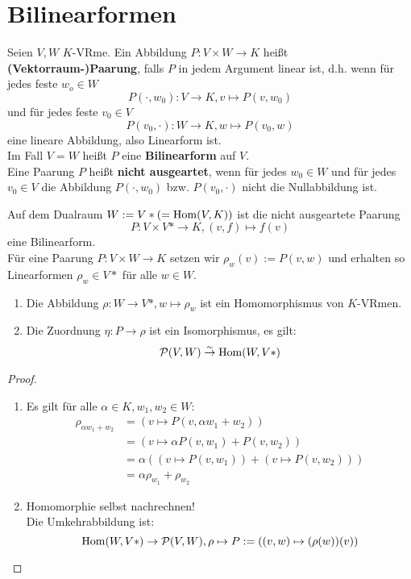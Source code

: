 \documentclass[parskip,a4paper,twoside,DIV15,BCOR12mm]{scrbook}
\begin{document}
\section{Bilinearformen}
\begin{definition}
Seien $V,W$ $K$-VRme. Ein Abbildung $P:V\times W\to K$ heißt \textbf{\mbox{(Vektorraum-)}Paarung},
falls $P$ in jedem Argument linear ist, d.h. wenn für jedes feste $w_o\in W$
\[P(\cdot,w_0):V\to K, v\mapsto P(v,w_0)\]
und für jedes feste $v_0\in V$
\[P(v_0,\cdot):W\to K, w\mapsto P(v_0,w)\]
eine lineare Abbildung, also Linearform ist.\\
Im Fall $V=W$ heißt $P$ eine \textbf{Bilinearform} auf $V$.\\
Eine Paarung $P$ heißt \textbf{nicht ausgeartet}, wenn für jedes $w_0\in W$ und
für jedes $v_0\in V$ die Abbildung $P(\cdot,w_0)$ bzw. $P(v_0,\cdot)$ nicht die Nullabbildung
ist.
\end{definition}

\begin{comment}
Die Menge $\mathcal{P}(V,W)$ aller Paarungen von $V$ und $W$ ist ein untervektorraum
des $K$-VRms $\Abb(V\times W,K)$ aller Abbildungen von $V\times W$ nach $K$.
\end{comment}

\begin{example}
Auf dem Dualraum $W:=V*(=\operatorname{Hom}(V,K))$ ist die nicht ausgeartete Paarung
\[P:V\times V*\to K,(v,f)\mapsto f(v)\]
eine Bilinearform.\\
Für eine Paarung $P:V\times W\to K$ setzen wir $\rho_w(v):=P(v,w)$ und erhalten
so Linearformen $\rho_w\in V*$ für alle $w\in W$.
\end{example}

\begin{theo}
\begin{enumerate}
\item Die Abbildung $\rho:W\to V*,w\mapsto \rho_w$ ist ein Homomorphismus
von $K$-VRmen.
\item Die Zuordnung $\eta:P\to \rho$ ist ein Isomorphismus, es gilt:
\[\mathcal{P}(V,W)\stackrel{\sim}{\to} \operatorname{Hom}(W,V*)\]
\end{enumerate}
\end{theo}

\begin{proof}
\begin{enumerate}
\item Es gilt für alle $\alpha\in K,w_1,w_2\in W$:
\begin{align*}
\rho_{\alpha w_1+w_2}&=(v\mapsto P(v,\alpha w_1+w_2))\\
&=(v\mapsto \alpha P(v,w_1)+P(v,w_2))\\
&=\alpha((v\mapsto P(v,w_1))+(v\mapsto P(v,w_2)))\\
&=\alpha\rho_{w_1}+\rho_{w_2} 
\end{align*}
\item Homomorphie selbst nachrechnen!\\
Die Umkehrabbildung ist:
\[\operatorname{Hom}(W,V*)\to \mathcal{P}(V,W),\rho\mapsto P:=((v,w)\mapsto(\rho(w))(v))\]
\end{enumerate}
\end{proof}
\end{document}
